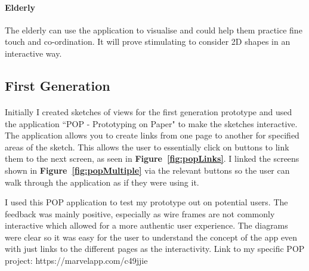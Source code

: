 \documentclass[11pt]{article}
\begin{document}
            \paragraph{Elderly}
            The elderly can use the application to visualise and could help them practice fine touch and co-ordination. It will prove stimulating to consider 2D shapes in an interactive way. 
            \clearpage
            
            \subsection{First Generation}
                    
                \paragraph{}
                Initially I created sketches of views for the first generation prototype and used the application ``POP - Prototyping on Paper" \cite{POP} to make the sketches interactive. The application allows you to create links from one page to another for specified areas of the sketch. This allows the user to essentially click on buttons to link them to the next screen, as seen in \textbf{Figure~\ref{fig:popLinks}}. I linked the screens shown in  \textbf{Figure~\ref{fig:popMultiple}} via the relevant buttons so the user can walk through the application as if they were using it.
                
                I used this POP application to test my prototype out on potential users. The feedback was mainly positive, especially as wire frames are not commonly interactive which allowed for a more authentic user experience. The diagrams were clear so it was easy for the user to understand the concept of the app even with just links to the different pages as the interactivity.
                Link to my specific POP project: https://marvelapp.com/c49jjie
                
\end{document}
